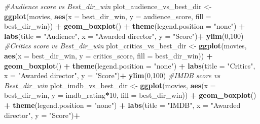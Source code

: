 \documentclass[]{article}
\newenvironment{Shaded}{\begin{snugshade}}{\end{snugshade}}
\newcommand{\KeywordTok}[1]{\textcolor[rgb]{0.13,0.29,0.53}{\textbf{#1}}}
\newcommand{\DataTypeTok}[1]{\textcolor[rgb]{0.13,0.29,0.53}{#1}}
\newcommand{\DecValTok}[1]{\textcolor[rgb]{0.00,0.00,0.81}{#1}}
\newcommand{\StringTok}[1]{\textcolor[rgb]{0.31,0.60,0.02}{#1}}
\newcommand{\CommentTok}[1]{\textcolor[rgb]{0.56,0.35,0.01}{\textit{#1}}}
\newcommand{\OperatorTok}[1]{\textcolor[rgb]{0.81,0.36,0.00}{\textbf{#1}}}
\newcommand{\NormalTok}[1]{#1}
\begin{document}
\begin{Shaded}
\begin{Highlighting}[]
\CommentTok{#Audience score vs Best_dir_win}
\NormalTok{plot_audience_vs_best_dir <-}
\StringTok{  }\KeywordTok{ggplot}\NormalTok{(movies,}
         \KeywordTok{aes}\NormalTok{(}\DataTypeTok{x =}\NormalTok{ best_dir_win, }\DataTypeTok{y =}\NormalTok{ audience_score, }\DataTypeTok{fill =}\NormalTok{ best_dir_win)) }\OperatorTok{+}
\StringTok{  }\KeywordTok{geom_boxplot}\NormalTok{() }\OperatorTok{+}
\StringTok{  }\KeywordTok{theme}\NormalTok{(}\DataTypeTok{legend.position =} \StringTok{"none"}\NormalTok{) }\OperatorTok{+}
\StringTok{  }\KeywordTok{labs}\NormalTok{(}\DataTypeTok{title =} \StringTok{"Audience"}\NormalTok{, }\DataTypeTok{x =} \StringTok{"Awarded director"}\NormalTok{, }\DataTypeTok{y =} \StringTok{"Score"}\NormalTok{)}\OperatorTok{+}
\StringTok{  }\KeywordTok{ylim}\NormalTok{(}\DecValTok{0}\NormalTok{,}\DecValTok{100}\NormalTok{)}
\CommentTok{#Critics score vs Best_dir_win}
\NormalTok{plot_critics_vs_best_dir <-}
\StringTok{  }\KeywordTok{ggplot}\NormalTok{(movies,}
         \KeywordTok{aes}\NormalTok{(}\DataTypeTok{x =}\NormalTok{ best_dir_win, }\DataTypeTok{y =}\NormalTok{ critics_score, }\DataTypeTok{fill =}\NormalTok{ best_dir_win)) }\OperatorTok{+}
\StringTok{  }\KeywordTok{geom_boxplot}\NormalTok{() }\OperatorTok{+}
\StringTok{  }\KeywordTok{theme}\NormalTok{(}\DataTypeTok{legend.position =} \StringTok{"none"}\NormalTok{) }\OperatorTok{+}
\StringTok{  }\KeywordTok{labs}\NormalTok{(}\DataTypeTok{title =} \StringTok{"Critics"}\NormalTok{, }\DataTypeTok{x =} \StringTok{"Awarded director"}\NormalTok{, }\DataTypeTok{y =} \StringTok{"Score"}\NormalTok{)}\OperatorTok{+}
\StringTok{  }\KeywordTok{ylim}\NormalTok{(}\DecValTok{0}\NormalTok{,}\DecValTok{100}\NormalTok{)}
\CommentTok{#IMDB score vs Best_dir_win}
\NormalTok{plot_imdb_vs_best_dir <-}
\StringTok{  }\KeywordTok{ggplot}\NormalTok{(movies, }\KeywordTok{aes}\NormalTok{(}\DataTypeTok{x =}\NormalTok{ best_dir_win, }\DataTypeTok{y =}\NormalTok{ imdb_rating}\OperatorTok{*}\DecValTok{10}\NormalTok{, }\DataTypeTok{fill =}\NormalTok{ best_dir_win)) }\OperatorTok{+}
\StringTok{  }\KeywordTok{geom_boxplot}\NormalTok{() }\OperatorTok{+}
\StringTok{  }\KeywordTok{theme}\NormalTok{(}\DataTypeTok{legend.position =} \StringTok{"none"}\NormalTok{) }\OperatorTok{+}
\StringTok{  }\KeywordTok{labs}\NormalTok{(}\DataTypeTok{title =} \StringTok{"IMDB"}\NormalTok{, }\DataTypeTok{x =} \StringTok{"Awarded director"}\NormalTok{, }\DataTypeTok{y =} \StringTok{"Score"}\NormalTok{)}\OperatorTok{+}

\end{Highlighting}
\end{Shaded}
\end{document}
